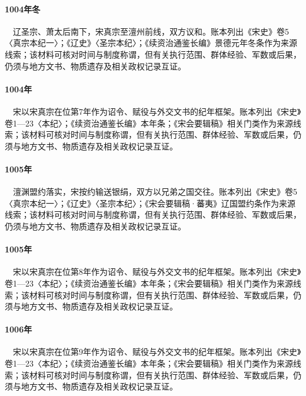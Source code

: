 \paragraph{1004年冬}　辽圣宗、萧太后南下，宋真宗至澶州前线，双方议和。账本列出《宋史》卷5〈真宗本纪一〉；《辽史》〈圣宗本纪〉；《续资治通鉴长编》景德元年冬条作为来源线索；该材料可核对时间与制度称谓，但有关执行范围、群体经验、军数或后果，仍须与地方文书、物质遗存及相关政权记录互证。

\paragraph{1004年}　宋以宋真宗在位第7年作为诏令、赋役与外交文书的纪年框架。账本列出《宋史》卷1—23〈本纪〉；《续资治通鉴长编》本年条；《宋会要辑稿》相关门类作为来源线索；该材料可核对时间与制度称谓，但有关执行范围、群体经验、军数或后果，仍须与地方文书、物质遗存及相关政权记录互证。

\paragraph{1005年}　澶渊盟约落实，宋按约输送银绢，双方以兄弟之国交往。账本列出《宋史》卷5〈真宗本纪一〉；《辽史》〈圣宗本纪〉；《宋会要辑稿·蕃夷》辽国盟约条作为来源线索；该材料可核对时间与制度称谓，但有关执行范围、群体经验、军数或后果，仍须与地方文书、物质遗存及相关政权记录互证。

\paragraph{1005年}　宋以宋真宗在位第8年作为诏令、赋役与外交文书的纪年框架。账本列出《宋史》卷1—23〈本纪〉；《续资治通鉴长编》本年条；《宋会要辑稿》相关门类作为来源线索；该材料可核对时间与制度称谓，但有关执行范围、群体经验、军数或后果，仍须与地方文书、物质遗存及相关政权记录互证。

\paragraph{1006年}　宋以宋真宗在位第9年作为诏令、赋役与外交文书的纪年框架。账本列出《宋史》卷1—23〈本纪〉；《续资治通鉴长编》本年条；《宋会要辑稿》相关门类作为来源线索；该材料可核对时间与制度称谓，但有关执行范围、群体经验、军数或后果，仍须与地方文书、物质遗存及相关政权记录互证。

